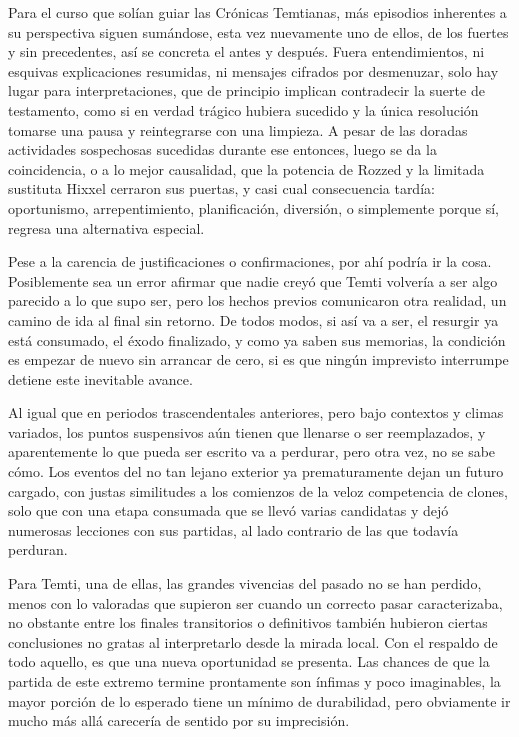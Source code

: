 \documentclass[
]{book}
\begin{document}
Para el curso que solían guiar las Crónicas Temtianas, más episodios inherentes a su perspectiva siguen sumándose, esta vez nuevamente uno de ellos, de los fuertes y sin precedentes, así se concreta el antes y después. Fuera entendimientos, ni esquivas explicaciones resumidas, ni mensajes cifrados por desmenuzar, solo hay lugar para interpretaciones, que de principio implican contradecir la suerte de testamento, como si en verdad trágico hubiera sucedido y la única resolución tomarse una pausa y reintegrarse con una limpieza. A pesar de las doradas actividades sospechosas sucedidas durante ese entonces, luego se da la coincidencia, o a lo mejor causalidad, que la potencia de Rozzed y la limitada sustituta Hixxel cerraron sus puertas, y casi cual consecuencia tardía: oportunismo, arrepentimiento, planificación, diversión, o simplemente porque sí, regresa una alternativa especial.

Pese a la carencia de justificaciones o confirmaciones, por ahí podría ir la cosa. Posiblemente sea un error afirmar que nadie creyó que Temti volvería a ser algo parecido a lo que supo ser, pero los hechos previos comunicaron otra realidad, un camino de ida al final sin retorno. De todos modos, si así va a ser, el resurgir ya está consumado, el éxodo finalizado, y como ya saben sus memorias, la condición es empezar de nuevo sin arrancar de cero, si es que ningún imprevisto interrumpe detiene este inevitable avance.

Al igual que en periodos trascendentales anteriores, pero bajo contextos y climas variados, los puntos suspensivos aún tienen que llenarse o ser reemplazados, y aparentemente lo que pueda ser escrito va a perdurar, pero otra vez, no se sabe cómo. Los eventos del no tan lejano exterior ya prematuramente dejan un futuro cargado, con justas similitudes a los comienzos de la veloz competencia de clones, solo que con una etapa consumada que se llevó varias candidatas y dejó numerosas lecciones con sus partidas, al lado contrario de las que todavía perduran.

Para Temti, una de ellas, las grandes vivencias del pasado no se han perdido, menos con lo valoradas que supieron ser cuando un correcto pasar caracterizaba, no obstante entre los finales transitorios o definitivos también hubieron ciertas conclusiones no gratas al interpretarlo desde la mirada local. Con el respaldo de todo aquello, es que una nueva oportunidad se presenta. Las chances de que la partida de este extremo termine prontamente son ínfimas y poco imaginables, la mayor porción de lo esperado tiene un mínimo de durabilidad, pero obviamente ir mucho más allá carecería de sentido por su imprecisión.
\end{document}
